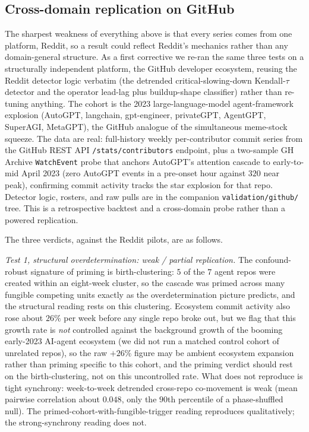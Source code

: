 \documentclass[11pt]{article}
\begin{document}
\subsection{Cross-domain replication on GitHub}
\label{sec:githubrep}

The sharpest weakness of everything above is that every series comes from one platform, Reddit, so a result could reflect Reddit's mechanics rather than any domain-general structure. As a first corrective we re-ran the same three tests on a structurally independent platform, the GitHub developer ecosystem, reusing the Reddit detector logic verbatim (the detrended critical-slowing-down Kendall-$\tau$ detector and the operator lead-lag plus buildup-shape classifier) rather than re-tuning anything. The cohort is the 2023 large-language-model agent-framework explosion (AutoGPT, langchain, gpt-engineer, privateGPT, AgentGPT, SuperAGI, MetaGPT), the GitHub analogue of the simultaneous meme-stock squeeze. The data are real: full-history weekly per-contributor commit series from the GitHub REST API \texttt{/stats/contributors} endpoint, plus a two-sample GH Archive \texttt{WatchEvent} probe that anchors AutoGPT's attention cascade to early-to-mid April 2023 (zero AutoGPT events in a pre-onset hour against $320$ near peak), confirming commit activity tracks the star explosion for that repo. Detector logic, rosters, and raw pulls are in the companion \texttt{validation/github/} tree. This is a retrospective backtest and a cross-domain probe rather than a powered replication.

The three verdicts, against the Reddit pilots, are as follows.

\emph{Test 1, structural overdetermination: weak / partial replication.} The confound-robust signature of priming is birth-clustering: $5$ of the $7$ agent repos were created within an eight-week cluster, so the cascade was primed across many fungible competing units exactly as the overdetermination picture predicts, and the structural reading rests on this clustering. Ecosystem commit activity also rose about $26\%$ per week before any single repo broke out, but we flag that this growth rate is \emph{not} controlled against the background growth of the booming early-2023 AI-agent ecosystem (we did not run a matched control cohort of unrelated repos), so the raw $+26\%$ figure may be ambient ecosystem expansion rather than priming specific to this cohort, and the priming verdict should rest on the birth-clustering, not on this uncontrolled rate. What does not reproduce is tight synchrony: week-to-week detrended cross-repo co-movement is weak (mean pairwise correlation about $0.048$, only the $90$th percentile of a phase-shuffled null). The primed-cohort-with-fungible-trigger reading reproduces qualitatively; the strong-synchrony reading does not.
\end{document}
